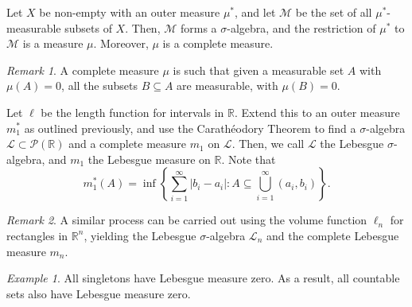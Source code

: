 \documentclass[11pt]{article}
\newcommand{\R}{\mathbb{R}}
\newcommand{\M}{\mathcal{M}}
\renewcommand{\L}{\mathcal{L}}
\theoremstyle{definition}
\theoremstyle{remark}
\newtheorem*{remark}{Remark}
\newtheorem*{example}{Example}
\numberwithin{equation}{section}
\begin{document}
    \begin{theorem}
        Let $X$ be non-empty with an outer measure $\mu^*$, and let $\M$ be the set
        of all $\mu^*$-measurable subsets of $X$. Then, $\M$ forms a
        $\sigma$-algebra, and the restriction of $\mu^*$ to $\M$ is a measure $\mu$.
        Moreover, $\mu$ is a complete measure.

        \begin{remark}
            A complete measure $\mu$ is such that given a measurable set $A$ with
            $\mu(A) = 0$, all the subsets $B \subseteq A$ are measurable, with
            $\mu(B) = 0$.
        \end{remark}
    \end{theorem}

    \begin{definition}
        Let $\ell$ be the length function for intervals in $\R$. Extend this to an
        outer measure $m_1^*$ as outlined previously, and use the Carath\'eodory
        Theorem to find a $\sigma$-algebra $\L \subset \mathcal{P}(\R)$ and a
        complete measure $m_1$ on $\L$. Then, we call $\L$ the Lebesgue
        $\sigma$-algebra, and $m_1$ the Lebesgue measure on $\R$. Note that \[
            m_1^*(A) = \inf\left\{\sum_{i = 1}^\infty |b_i - a_i|: A \subseteq
            \bigcup_{i = 1}^\infty (a_i, b_i)\right\}.
        \] 
        \begin{remark}
            A similar process can be carried out using the volume function $\ell_n$
            for rectangles in $\R^n$, yielding the Lebesgue $\sigma$-algebra $\L_n$
            and the complete Lebesgue measure $m_n$.
        \end{remark}
    \end{definition}

    \begin{example}
        All singletons have Lebesgue measure zero. As a result, all countable sets
        also have Lebesgue measure zero.
    \end{example}
\end{document}
